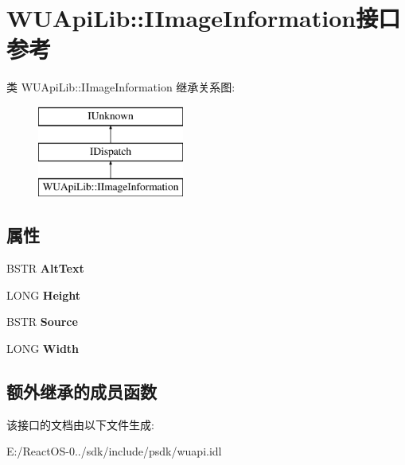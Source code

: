 \hypertarget{interface_w_u_api_lib_1_1_i_image_information}{}\section{W\+U\+Api\+Lib\+:\+:I\+Image\+Information接口 参考}
\label{interface_w_u_api_lib_1_1_i_image_information}
类 W\+U\+Api\+Lib\+:\+:I\+Image\+Information 继承关系图\+:\begin{figure}[H]
\begin{center}
\leavevmode
\includegraphics[height=3.000000cm]{interface_w_u_api_lib_1_1_i_image_information}
\end{center}
\end{figure}
\subsection*{属性}
\begin{DoxyCompactItemize}
\item 
\mbox{\label{interface_w_u_api_lib_1_1_i_image_information_a07bca454647334772a693c360e9ff992}} 
B\+S\+TR {\bfseries Alt\+Text}
\item 
\mbox{\label{interface_w_u_api_lib_1_1_i_image_information_ab02cbabd31e3e5967fcf06c9266e7157}} 
L\+O\+NG {\bfseries Height}
\item 
\mbox{\label{interface_w_u_api_lib_1_1_i_image_information_a69153d634684417a07d63a67cbe0c68c}} 
B\+S\+TR {\bfseries Source}
\item 
\mbox{\label{interface_w_u_api_lib_1_1_i_image_information_aad92397e16527240d808645c13eefab2}} 
L\+O\+NG {\bfseries Width}
\end{DoxyCompactItemize}
\subsection*{额外继承的成员函数}


该接口的文档由以下文件生成\+:\begin{DoxyCompactItemize}
\item 
E\+:/\+React\+O\+S-\/0../sdk/include/psdk/wuapi.\+idl\end{DoxyCompactItemize}
